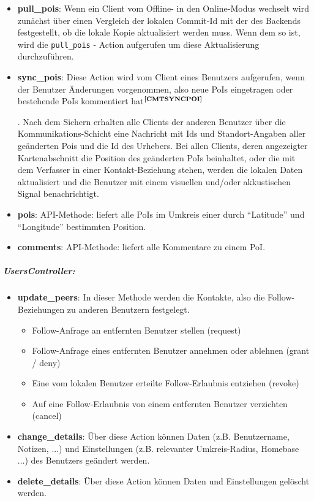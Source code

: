 \begin{itemize}[leftmargin=*,noitemsep,topsep=1ex,parsep=0pt,partopsep=0pt]
\item \textbf{pull\_pois}: Wenn ein Client vom Offline- in den Online-Modus wechselt wird zunächst über einen Vergleich der lokalen Commit-Id mit der des Backends festgestellt, ob die lokale Kopie aktualisiert werden muss. Wenn dem so ist, wird die \texttt{pull\_pois} - Action aufgerufen um diese Aktualisierung durchzuführen. 
\item \textbf{sync\_pois}: Diese Action wird vom Client eines Benutzers aufgerufen, wenn der Benutzer Änderungen vorgenommen, also neue PoIs eingetragen oder bestehende PoIs kommentiert hat$^{\textbf{\ref{CMTSYNCPOI}}}$%
\addtocounter{footnote}{1}%
.
Nach dem Sichern erhalten alle Clients der anderen Benutzer über die Kommunikations-Schicht eine Nachricht mit Ids und Standort-Angaben aller geänderten Pois und die Id des Urhebers. Bei allen Clients, deren angezeigter Kartenabschnitt die Position des geänderten PoIs beinhaltet, oder die mit dem Verfasser in einer Kontakt-Beziehung stehen, werden die lokalen Daten aktualisiert und die Benutzer mit einem visuellen und/oder akkustischen Signal benachrichtigt.
\item \textbf{pois}: API-Methode: liefert alle PoIs im Umkreis einer durch "`Latitude"' und "`Longitude"' bestimmten Position.
\item \textbf{comments}: API-Methode: liefert alle Kommentare zu einem PoI.
\end{itemize}
\subparagraph{UsersController:}
\begin{itemize}[leftmargin=*,noitemsep,topsep=1ex,parsep=0pt,partopsep=0pt]
\item \textbf{update\_peers}: In dieser Methode werden die Kontakte, also die Follow-Beziehungen zu anderen Benutzern festgelegt.
  \begin{itemize}[leftmargin=*,noitemsep,topsep=1ex,parsep=0pt,partopsep=0pt]
    \item Follow-Anfrage an entfernten Benutzer stellen (request)
    \item Follow-Anfrage eines entfernten Benutzer annehmen oder ablehnen (grant / deny)
    \item Eine vom lokalen Benutzer erteilte Follow-Erlaubnis entziehen (revoke)
    \item Auf eine Follow-Erlaubnis von einem entfernten Benutzer verzichten (cancel)
  \end{itemize}
\item \textbf{change\_details}: Über diese Action können Daten (z.B. Benutzername, Notizen, ...) und Einstellungen (z.B. relevanter Umkreis-Radius, Homebase ...) des Benutzers geändert werden.
\item \textbf{delete\_details}: Über diese Action können Daten und Einstellungen gelöscht werden.
\end{itemize}
